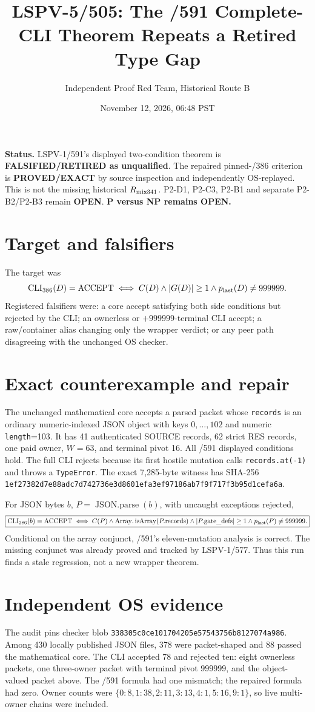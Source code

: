 \documentclass[10pt]{article}
\title{LSPV-5/505: The /591 Complete-CLI Theorem Repeats a Retired Type Gap}
\author{Independent Proof Red Team, Historical Route B}
\date{November 12, 2026, 06:48 PST}
\begin{document}
\maketitle
\noindent\textbf{Status.} LSPV-1/591's displayed two-condition theorem is
\textbf{FALSIFIED/RETIRED as unqualified}.  The repaired pinned-/386 criterion is
\textbf{PROVED/EXACT} by source inspection and independently OS-replayed.
This is not the missing historical \(R_{\rm mix341}\).  P2-D1, P2-C3, P2-B1 and
separate P2-B2/P2-B3 remain \textbf{OPEN}.  \textbf{P versus NP remains OPEN.}

\section*{Target and falsifiers}
The target was
\[
\operatorname{CLI}_{386}(D)=\operatorname{ACCEPT}
\iff C(D)\wedge |G(D)|\ge1\wedge p_{\rm last}(D)\ne999999.
\]
Registered falsifiers were: a core accept satisfying both side conditions but rejected by the
CLI; an ownerless or \(+999999\)-terminal CLI accept; a raw/container alias changing only the
wrapper verdict; or any peer path disagreeing with the unchanged OS checker.

\section*{Exact counterexample and repair}
The unchanged mathematical core accepts a parsed packet whose \texttt{records} is an ordinary
numeric-indexed JSON object with keys \(0,\ldots,102\) and numeric \texttt{length}=103.
It has 41 authenticated SOURCE records, 62 strict RES records, one paid owner, \(W=63\), and
terminal pivot 16.  All /591 displayed conditions hold.  The full CLI rejects because its first
hostile mutation calls \texttt{records.at(-1)} and throws a \texttt{TypeError}.
The exact 7,285-byte witness has SHA-256
\texttt{1ef27382d7e88adc7d742736e3d8601efa3ef97186ab7f9f717f3b95d1cefa6a}.

For JSON bytes \(b\), \(P=\operatorname{JSON.parse}(b)\), with uncaught exceptions rejected,
\[
\boxed{\operatorname{CLI}_{386}(b)=\operatorname{ACCEPT}\iff
C(P)\wedge\operatorname{Array.isArray}(P.\mathrm{records})
\wedge |P.\mathrm{gate\_defs}|\ge1\wedge p_{\rm last}(P)\ne999999.}
\]
Conditional on the array conjunct, /591's eleven-mutation analysis is correct.  The missing
conjunct was already proved and tracked by LSPV-1/577.  Thus this run finds a stale regression,
not a new wrapper theorem.

\section*{Independent OS evidence}
The audit pins checker blob \texttt{338305c0ce101704205e57543756b8127074a986}.
Among 430 locally published JSON files, 378 were packet-shaped and 88 passed the mathematical
core.  The CLI accepted 78 and rejected ten: eight ownerless packets, one three-owner packet
with terminal pivot \(999999\), and the object-valued packet above.  The /591 formula had one
mismatch; the repaired formula had zero.  Owner counts were
\(\{0:8,1:38,2:11,3:13,4:1,5:16,9:1\}\), so live multi-owner chains were included.
\end{document}
